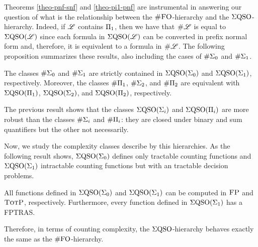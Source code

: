 Theorems \ref{theo-pnf-snf} and \ref{theo-pi1-pnf} are instrumental in answering our question of what is the relationship between the $\text{\sc \#FO}$-hierarchy and the $\Sigma{\rm QSO}$-hierarchy. 
Indeed, if $\mathscr{L}$ contains $\Pi_{1}$, then we have that $\text{\sc \#} \mathscr{L}$ is equal to $\Sigma{\rm QSO}(\mathscr{L})$ since each formula in $\Sigma{\rm QSO}(\mathscr{L})$ can be converted in prefix normal form and, therefore, it is equivalent to a formula in $\text{\sc \#} \mathscr{L}$. 
The following proposition summarizes these results, also including the cases of $\#\Sigma_{0}$ and $\#\Sigma_{1}$.
\begin{proposition}
	The classes $\#\Sigma_{0}$ and $\#\Sigma_{1}$ are strictly contained in $\Sigma{\rm QSO}(\Sigma_{0})$ and $\Sigma{\rm QSO}(\Sigma_{1})$, respectively. Moreover, the classes $\#\Pi_{1}$, $\#\Sigma_{2}$, and $\#\Pi_{2}$ are equivalent with $\Sigma{\rm QSO}(\Pi_{1})$, $\Sigma{\rm QSO}(\Sigma_{2})$, and $\Sigma{\rm QSO}(\Pi_{2})$, respectively.
\end{proposition}
The previous result shows that the classes $\Sigma{\rm QSO}(\Sigma_{i})$ and $\Sigma{\rm QSO}(\Pi_{i})$ are more robust than the classes $\#\Sigma_{i}$ and $\#\Pi_{i}$: they are closed under binary and sum quantifiers but the other not necessarily. 

Now, we study the complexity classes describe by this hierarchies. As the following result shows, $\Sigma{\rm QSO}(\Sigma_{0})$ defines only tractable counting functions and $\Sigma{\rm QSO}(\Sigma_{1})$ intractable counting functions but with an tractable decision problems. 
\begin{proposition}
All functions defined in $\Sigma{\rm QSO}(\Sigma_{0})$ and $\Sigma{\rm QSO}(\Sigma_{1})$ can be computed in $\text{\sc FP}$ and $\text{\sc TotP}$, respectively. Furthermore, every function defined in $\Sigma{\rm QSO}(\Sigma_{1})$ has a FPTRAS.
\end{proposition}
Therefore, in terms of counting complexity, the $\Sigma{\rm QSO}$-hierarchy behaves exactly the same as the $\#{\rm FO}$-hierarchy.

